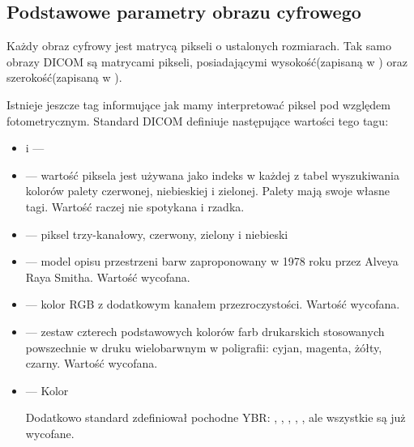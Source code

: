 \subsection{Podstawowe parametry obrazu cyfrowego}

\par
Każdy obraz cyfrowy jest matrycą pikseli o ustalonych rozmiarach.
Tak samo obrazy DICOM są matrycami pikseli, posiadającymi wysokość(zapisaną w ) oraz szerokość(zapisaną w ).

\par
Istnieje jeszcze tag  informujące jak mamy interpretować piksel pod względem fotometrycznym.
Standard DICOM definiuje następujące wartości tego tagu:
\begin{itemize}
    \item {} i  ---

    \item {} --- wartość piksela jest używana jako indeks w każdej z tabel wyszukiwania kolorów palety czerwonej, niebieskiej i zielonej.
          Palety mają swoje własne tagi.
          Wartość raczej nie spotykana i rzadka.

    \item {} --- piksel trzy-kanałowy, czerwony, zielony i niebieski

    \item {}  --- model opisu przestrzeni barw zaproponowany w 1978 roku przez Alveya Raya Smitha.
          Wartość wycofana.

    \item {} --- kolor RGB z dodatkowym kanałem przezroczystości.
          Wartość wycofana.

    \item {} --- zestaw czterech podstawowych kolorów farb drukarskich stosowanych powszechnie w druku wielobarwnym w poligrafii: cyjan, magenta, żółty, czarny.
          Wartość wycofana.

    \item {} --- Kolor

          Dodatkowo standard zdefiniował pochodne YBR: , , , , , ale wszystkie są już wycofane.
\end{itemize}

